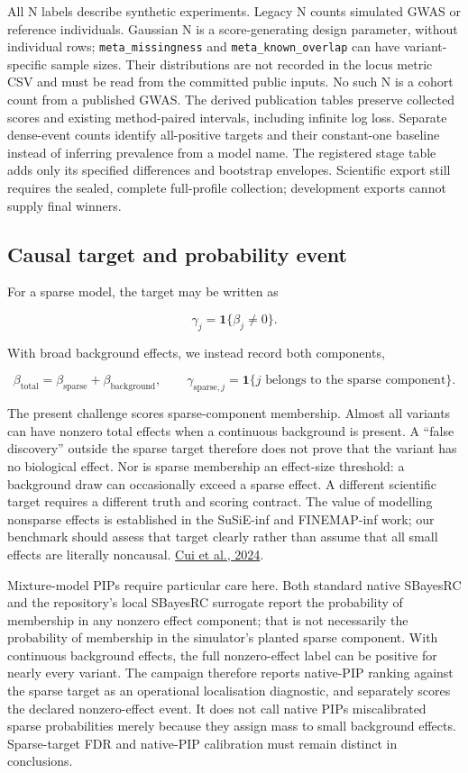 \documentclass[
  british,
  10pt,
]{article}
\begin{document}
All N labels describe synthetic experiments. Legacy N counts simulated
GWAS or reference individuals. Gaussian N is a score-generating design
parameter, without individual rows; \texttt{meta\_missingness} and
\texttt{meta\_known\_overlap} can have variant-specific sample sizes.
Their distributions are not recorded in the locus metric CSV and must be
read from the committed public inputs. No such N is a cohort count from
a published GWAS. The derived publication tables preserve collected
scores and existing method-paired intervals, including infinite log
loss. Separate dense-event counts identify all-positive targets and
their constant-one baseline instead of inferring prevalence from a model
name. The registered stage table adds only its specified differences and
bootstrap envelopes. Scientific export still requires the sealed,
complete full-profile collection; development exports cannot supply
final winners.

\subsection{Causal target and probability
event}\label{causal-target-and-probability-event}

For a sparse model, the target may be written as

\[\gamma_j=\mathbf{1}\{\beta_j\ne0\}.\]

With broad background effects, we instead record both components,

\[\beta_{\mathrm{total}}=\beta_{\mathrm{sparse}}+
\beta_{\mathrm{background}},\qquad
\gamma_{\mathrm{sparse},j}=\mathbf{1}\{j\text{ belongs to the sparse component}\}.\]

The present challenge scores sparse-component membership. Almost all
variants can have nonzero total effects when a continuous background is
present. A ``false discovery'' outside the sparse target therefore does
not prove that the variant has no biological effect. Nor is sparse
membership an effect-size threshold: a background draw can occasionally
exceed a sparse effect. A different scientific target requires a
different truth and scoring contract. The value of modelling nonsparse
effects is established in the SuSiE-inf and FINEMAP-inf work; our
benchmark should assess that target clearly rather than assume that all
small effects are literally noncausal.
\href{https://doi.org/10.1038/s41588-023-01597-3}{Cui et al., 2024}.

Mixture-model PIPs require particular care here. Both standard native
SBayesRC and the repository's local SBayesRC surrogate report the
probability of membership in any nonzero effect component; that is not
necessarily the probability of membership in the simulator's planted
sparse component. With continuous background effects, the full
nonzero-effect label can be positive for nearly every variant. The
campaign therefore reports native-PIP ranking against the sparse target
as an operational localisation diagnostic, and separately scores the
declared nonzero-effect event. It does not call native PIPs
miscalibrated sparse probabilities merely because they assign mass to
small background effects. Sparse-target FDR and native-PIP calibration
must remain distinct in conclusions.
\end{document}
